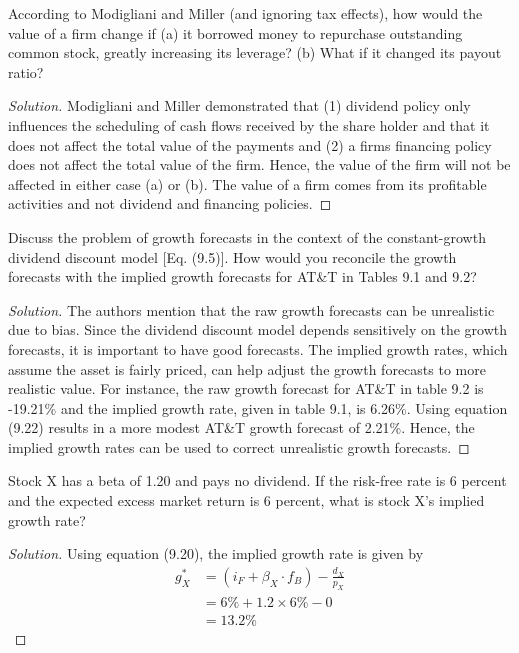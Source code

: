 \begin{problem}{9.1}
  According to Modigliani and Miller (and ignoring tax effects), how would the value of a firm change if (a) it borrowed money to repurchase outstanding common stock, greatly increasing its leverage? (b) What if it changed its payout ratio?
\end{problem}

\begin{proof}[Solution]
  Modigliani and Miller demonstrated that (1) dividend policy only influences the scheduling of cash flows received by the share holder and that it does not affect the total value of the payments and (2) a firms financing policy does not affect the total value of the firm. Hence, the value of the firm will not be affected in either case (a) or (b). The value of a firm comes from its profitable activities and not dividend and financing policies.
\end{proof}

\begin{problem}{9.2}
 Discuss the problem of growth forecasts in the context of the constant-growth dividend discount model [Eq. (9.5)]. How would you reconcile the growth forecasts with the implied growth forecasts for AT\&T in Tables 9.1 and 9.2?
\end{problem}

\begin{proof}[Solution]
 The authors mention that the raw growth forecasts can be unrealistic due to bias. Since the dividend discount model depends sensitively on the growth forecasts, it is important to have good forecasts. The implied growth rates, which assume the asset is fairly priced, can help adjust the growth forecasts to more realistic value. For instance, the raw growth forecast for AT\&T in table 9.2 is -19.21\% and the implied growth rate, given in table 9.1, is 6.26\%. Using equation (9.22) results in a more modest AT\&T growth forecast of 2.21\%. Hence, the implied growth rates can be used to correct unrealistic growth forecasts.
\end{proof}

\begin{problem}{9.3}
  Stock X has a beta of 1.20 and pays no dividend. If the risk-free rate is 6 percent and the expected excess market return is 6 percent, what is stock X's implied growth rate?
\end{problem}

\begin{proof}[Solution]
  Using equation (9.20), the implied growth rate is given by
  \begin{align*}
   g_{X}^{*}&=(i_{F}+\beta_X\cdot f_{B}) - \frac{d_{X}}{p_{X}}\\
	    &=6\% + 1.2\times 6\% - 0 \\
	    &=13.2\%
  \end{align*}
\end{proof}

